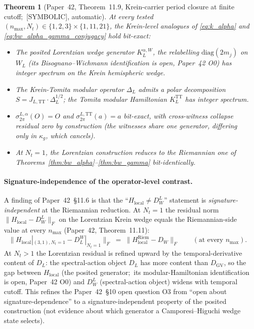 \documentclass[11pt,a4paper]{article}
\theoremstyle{plain}
\newtheorem{theorem}{Theorem}[section]
\theoremstyle{definition}
\newcommand{\nmax}{n_{\max}}
\newcommand{\Nt}{N_{t}}
\newcommand{\DGV}{D_{\mathrm{GV}}}
\newcommand{\DL}{D_{L}}
\begin{document}
\begin{theorem}[Paper~42, Theorem~11.9, Krein-carrier period closure
at finite cutoff;\ {[SYMBOLIC]}, automatic]
\label{thm:lorentzian_four_witness}
At every tested $(\nmax, \Nt) \in \{1, 2, 3\} \times \{1, 11, 21\}$,
the Krein-level analogues of \eqref{eq:k_alpha} and
\eqref{eq:bw_alpha_gamma_conjugacy} hold bit-exact:
\begin{itemize}\setlength\itemsep{0pt}
\item[(i)] The posited Lorentzian wedge generator
$K_{L}^{\alpha,W}$, the relabelling $\mathrm{diag}(2m_{j})$ on $W_{L}$ (its
Bisognano--Wichmann identification is open, Paper~42 O0) has integer
spectrum on the Krein hemispheric wedge.
\item[(ii)] The Krein-Tomita modular operator $\Delta_{L}$ admits a
polar decomposition $S = J_{L,\mathrm{TT}} \cdot \Delta_{L}^{1/2}$;
the Tomita modular Hamiltonian $K_{L}^{\mathrm{TT}}$ has integer
spectrum.
\item[(iii)] $\sigma_{2\pi}^{L,\alpha}(O) = O$ and
$\sigma_{2\pi}^{L,\mathrm{TT}}(a) = a$ bit-exact, with cross-witness
collapse residual zero by construction (the witnesses share one
generator, differing only in $\kappa_g$, which cancels).
\item[(iv)] At $\Nt = 1$, the Lorentzian construction reduces to the
Riemannian one of Theorems~\ref{thm:bw_alpha}--\ref{thm:bw_gamma}
bit-identically.
\end{itemize}
\end{theorem}

\paragraph{Signature-independence of the operator-level contrast.}
A finding of Paper~42~\S 11.6 is that the
``$H_{\mathrm{local}} \ne D_{W}^{L}$'' statement is
\emph{signature-independent} at the Riemannian reduction.  At
$\Nt = 1$ the residual norm $\|H_{\mathrm{local}} - D_{W}^{L}\|_{F}$
on the Lorentzian Krein wedge equals the Riemannian-side value at
every $\nmax$ (Paper~42, Theorem~11.11):
\begin{equation*}
\|H_{\mathrm{local}}|_{(3,1),\Nt=1} - D_{L}^{W}|_{\Nt=1}\|_{F}
\;=\;
\|H_{\mathrm{local}}^{\mathrm{Riem}} - D_{W}\|_{F}
\qquad
(\text{at every } \nmax).
\end{equation*}
At $\Nt > 1$ the Lorentzian residual is refined upward by the
temporal-derivative content of $\DL$: the spectral-action object
$\DL$ has more content than $\DGV$, so the gap between
$H_{\mathrm{local}}$ (the posited generator;\ its modular-Hamiltonian
identification is open, Paper~42 O0) and $D_{W}^{L}$
(spectral-action object) widens with temporal cutoff.  This refines
the Paper~42~\S 10 open question O3 from
``open about signature-dependence'' to a signature-independent
property of the posited construction (not evidence about which
generator a Camporesi--Higuchi wedge state selects).
\end{document}
